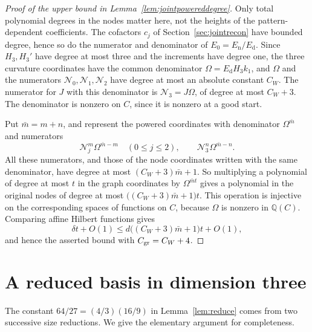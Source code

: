 \documentclass[11pt]{article}
\theoremstyle{definition}
\theoremstyle{remark}
\begin{document}
\begin{proof}[Proof of the upper bound in Lemma~\ref{lem:jointpowereddegree}]
Only total polynomial degrees in the nodes matter here, not the heights of the
pattern-dependent coefficients. The cofactors $c_j$ of
Section~\ref{sec:jointrecon} have bounded degree, hence so do the numerator
and denominator of $E_0=E_{\mathrm n}/E_{\mathrm d}$. Since $H_3,H_3'$ have
degree at most three and the increments have degree one, the three curvature
coordinates have the common denominator $\Omega=E_{\mathrm d}H_3k_1$, and
$\Omega$ and the numerators $\mathcal N_0,\mathcal N_1,\mathcal N_2$ have
degree at most an absolute constant $C_W$. The numerator for $J$ with this
denominator is $\mathcal N_3=J\Omega$, of degree at most $C_W+3$. The
denominator is nonzero on $C$, since it is nonzero at a good start.

Put $\bar m=m+n$, and represent the powered coordinates with denominator
$\Omega^{\bar m}$ and numerators
\[
 \mathcal N_j^m\Omega^{\bar m-m}\quad(0\le j\le2),
 \qquad
 \mathcal N_3^n\Omega^{\bar m-n}.
\]
All these numerators, and those of the node coordinates written with the same
denominator, have degree at most $(C_W+3)\bar m+1$. So multiplying a
polynomial of degree at most $t$ in the graph coordinates by $\Omega^{\bar mt}$
gives a polynomial in the original nodes of degree at most
$\bigl((C_W+3)\bar m+1\bigr)t$. This operation is injective on the
corresponding spaces of functions on $C$, because $\Omega$ is nonzero in
$\mathbb Q(C)$. Comparing affine Hilbert functions gives
\[
 \delta t+O(1)\le d\bigl((C_W+3)\bar m+1\bigr)t+O(1),
\]
and hence the asserted bound with $C_{\rm gr}=C_W+4$.
\end{proof}

\section{A reduced basis in dimension three}\label{app:reduction}

The constant $64/27=(4/3)(16/9)$ in Lemma~\ref{lem:reduce} comes from two
successive size reductions. We give the elementary argument for completeness.
\end{document}
